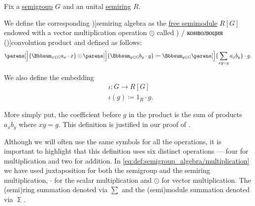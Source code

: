 \begin{definition}\label{def:semigroup_algebra}
  Fix a \hyperref[def:semigroup]{semigroup} \( G \) and an unital \hyperref[def:semiring]{semiring} \( R \).

  We define the corresponding \term[ru=групповая алгебра (\cite[504]{Винберг2014КурсАлгебры})]{semiring algebra} as the \hyperref[def:free_semimodule]{free semimodule} \( R[G] \) endowed with a vector multiplication operation \( \odot \) called \term[ru=свёртка (\cite[62]{Боровков1999ТеорияВероятностей}) / конволюция (\cite[179]{ИоффеТихомиров1974ЭкстремальныеЗадачи})]{convolution product} and defined as follows:
  \begin{equation}\label{eq:def:semigroup_algebra/multiplication}
    \parens[\Big]{ \Bbbsum_{x \in G} a_x \cdot x } \odot \parens[\Big]{ \Bbbsum_{y \in G} b_y \cdot y }
    \coloneqq
    \Bbbsum_{g \in G} \parens[\Big]{ \sum_{xy = g} a_x b_y } \cdot g.
  \end{equation}

  We also define the embedding
  \begin{equation}\label{eq:def:semigroup_algebra/embedding}
    \begin{aligned}
      &\iota: G \to R[G] \\
      &\iota(g) \coloneqq 1_R \cdot g.
    \end{aligned}
  \end{equation}
\end{definition}
\begin{comments}
  \item More simply put, the coefficient before \( g \) in the product is the sum of products \( a_x b_y \) where \( xy = g \). This definition is justified in our proof of .

  \item Although we will often use the same symbols for all the operations, it is important to highlight that this definition uses six distinct operations --- four for multiplication and two for addition. In \eqref{eq:def:semigroup_algebra/multiplication} we have used juxtaposition for both the semigroup and the semiring multiplication, \( \cdot \) for the scalar multiplication and \( \odot \) for vector multiplication. The (semi)ring summation denoted via \( \sum \) and the (semi)module summation denoted via \( \Bbbsum \).
\end{comments}

